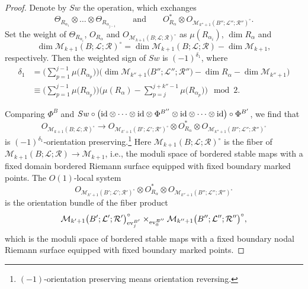 \documentclass[pdftex]{sigma}
\numberwithin{equation}{section}
\theoremstyle{definition}
\begin{document}
\begin{proof}
 Denote by $Sw$ the operation, which exchanges
 \[
 \Theta_{R_{\alpha_1}} \otimes \dots \otimes \Theta_{R_{\alpha_{j-1}}} \qquad \text{and} \qquad
 O_{R_{\alpha}}^* \otimes O_{{\mathcal M}_{k''+1}(B'';{\mathcal L}'';{\mathcal R}'')^{\circ}}.
 \]
Set the weight of $\Theta_{R_{\alpha_i}}$, $O_{R_{\alpha}}$ and $O_{{\mathcal M}_{k+1}(B;{\mathcal L};{\mathcal R})^{\circ}}$
as $\mu(R_{\alpha_i})$, $\dim R_{\alpha}$ and
\[
\dim {\mathcal M}_{k+1}(B;{\mathcal L};{\mathcal R})^{\circ} =
\dim {\mathcal M}_{k+1}(B;{\mathcal L};{\mathcal R}) - \dim {\mathcal M}_{k+1},
\]
 respectively.
Then the weighted sign of $Sw$ is $(-1)^{\delta_1}$, where
\begin{align*}
\delta_1  &{}=  \Biggl(\sum_{p=1}^{j-1}\mu\bigl(R_{\alpha_p}\bigr)\Biggr) \bigl(\dim {\mathcal M}_{k''+1}\bigl(B'';{\mathcal L}'';{\mathcal R}''\bigr) - \dim R_{\alpha} - \dim {\mathcal M}_{k''+1} \bigr) \\
 &{}\equiv  \Biggl( \sum_{p=1}^{j-1}\mu\bigl(R_{\alpha_p}\bigr)\Biggr) \Biggl( \mu(R_{\alpha}) - \sum_{p=j}^{j+k''-1}\mu\bigl(R_{\alpha_p}\bigr) \Biggr) \mod 2.
\end{align*}

Comparing $\Phi^B$ and $Sw \circ \bigl({\rm id} \otimes \dots \otimes {\rm id} \otimes \Phi^{B''} \otimes {\rm id} \otimes \dots \otimes {\rm id}\bigr) \circ \Phi^{B'}$, we find that
\[O_{{\mathcal M}_{k+1}(B;{\mathcal L};{\mathcal R})^{\circ}} \to
O_{{\mathcal M}_{k'+1}(B';{\mathcal L}';{\mathcal R}')^{\circ}} \otimes O_{R_{\alpha}}^* \otimes O_{{\mathcal M}_{k''+1}(B'';{\mathcal L}'';{\mathcal R}'')^{\circ}}\]
is $(-1)^{\delta_1}$-orientation preserving.\footnote{ $(-1)$-orientation preserving means orientation reversing. }
Here ${\mathcal M}_{k+1}(B;{\mathcal L};{\mathcal R})^{\circ}$ is the fiber of
${\mathcal M}_{k+1}(B;{\mathcal L};{\mathcal R}) \to {\mathcal M}_{k+1}$, i.e., the moduli space of bordered stable maps
with a fixed domain bordered Riemann surface equipped with fixed boundary marked points.
The $O(1)$-local system
\[
O_{{\mathcal M}_{k'+1}(B';{\mathcal L}';{\mathcal R}')^{\circ}} \otimes O_{R_{\alpha}}^* \otimes O_{{\mathcal M}_{k''+1}(B'';{\mathcal L}'';{\mathcal R}'')^{\circ}}
\]
is the orientation bundle of the fiber product
\[
{\mathcal M}_{k'+1}\bigl(B';{\mathcal L}';{\mathcal R}'\bigr)^{\circ}_{{\rm ev}_j^{B'}} \times_{{\rm ev}_0^{B''}} {\mathcal M}_{k''+1}\bigl(B'';{\mathcal L}'';{\mathcal R}''\bigr)^{\circ},
\]
which is the moduli space of bordered stable maps with a fixed boundary nodal Riemann surface equipped with fixed boundary marked points.


\end{proof}
\end{document}
